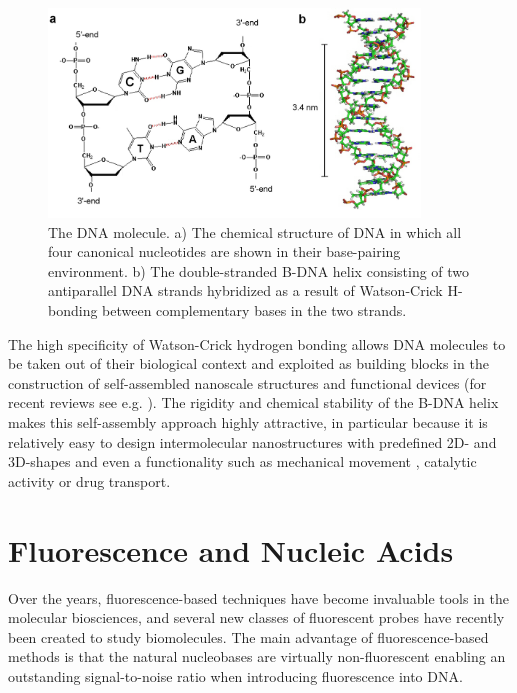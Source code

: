 \begin{figure}
    \centering
        \includegraphics[width=0.88\textwidth]{adds//dna.png}
    \captionsetup{width=.95\textwidth}
    \caption{The DNA molecule. a) The chemical structure of DNA in which all four canonical nucleotides are shown in their base-pairing environment. b) The double-stranded B-DNA helix consisting of two antiparallel DNA strands hybridized as a result of Watson-Crick H-bonding between complementary bases in the two strands.}
    \label{Fig:chap_intro_dna}
\end{figure}

 The high specificity of Watson-Crick hydrogen bonding allows DNA molecules to be taken out of their biological context and exploited as building blocks in the construction of self-assembled nanoscale structures and functional devices (for recent reviews see e.g. \cite{Seeman2007,Seeman2010,Kuzuya2010,Nangreave2010,Torring2011,Shih2010,Aldaye2008}). The rigidity and chemical stability of the B-DNA helix makes this self-assembly approach highly attractive, in particular because it is relatively easy to design intermolecular nanostructures with predefined 2D- and 3D-shapes \cite{Tumpane2007,Rothemund2006,Simmel2008,Dietz2009,Douglas2009} and even a functionality such as mechanical movement \cite{Shin2004,Chen2004,Sherman2004,Li2002,Wickham2012,Wickham2011,Lund2010}, catalytic activity \cite{Baum2008,Chen2004a,Xiao2004} or drug transport\cite{Andersen2009,Douglas2012}.

\section{Fluorescence and Nucleic Acids}
 Over the years, fluorescence-based techniques have become invaluable tools in the molecular biosciences, and several new classes of fluorescent probes have recently been created to study biomolecules. The main advantage of fluorescence-based methods is that the natural nucleobases are virtually non-fluorescent \cite{Callis1983} enabling an outstanding signal-to-noise ratio when introducing fluorescence into DNA.

